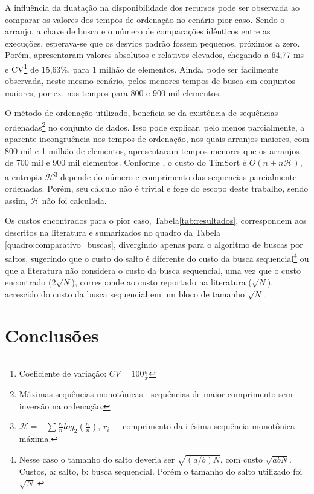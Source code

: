\documentclass[12pt]{article}
\begin{document}
A influência da fluatação na disponibilidade dos recursos pode ser observada ao comparar os valores dos tempos de ordenação no cenário pior caso. Sendo o arranjo, a chave de busca e o número de comparações idênticos entre as execuções, esperava-se que os desvios padrão fossem pequenos, próximos a zero. Porém, apresentaram valores absolutos e relativos elevados, chegando a 64,77 ms e CV\footnote{Coeficiente de variação: $CV=100\frac{\sigma}{\bar{x}}$} de 15,63\%, para 1 milhão de elementos. Ainda, pode ser facilmente observada, neste mesmo cenário, pelos menores tempos de busca em conjuntos maiores, por ex. nos tempos para 800 e 900 mil elementos.

O método de ordenação utilizado, beneficia-se da existência de sequências ordenadas\footnote{Máximas sequências monotônicas - sequências de maior comprimento sem inversão na ordenação.} no conjunto de dados. Isso pode explicar, pelo menos parcialmente, a aparente incongruência nos tempos de ordenação, nos quais arranjos maiores, com 800 mil e 1 milhão de elementos, apresentaram tempos menores que os arranjos de 700 mil e 900 mil elementos. Conforme \cite{auger:hal-01798381}, o custo do TimSort é $O(n + n\mathcal{H})$, a entropia $\mathcal{H}$\footnote{$\mathcal{H}=-\sum{\frac{r_{i}}{n} log_{2}(\frac{r_{i}}{n})}$, $r_{i} - $ comprimento da i-ésima sequência monotônica máxima.} depende do número e comprimento das sequencias parcialmente ordenadas. Porém, seu cálculo não é trivial e foge do escopo deste trabalho, sendo assim, $\mathcal{H}$ não foi calculada.

Os custos encontrados para o pior caso, Tabela\ref{tab:resultados}, correspondem aos descritos na literatura e sumarizados no quadro da Tabela \ref{quadro:comparativo_buscas}, divergindo apenas para o algoritmo de buscas por saltos, sugerindo que o custo do salto é diferente do custo da busca sequencial\footnote{Nesse caso o tamanho do salto deveria ser $\sqrt{(a/b)N}$, com custo $\sqrt{abN}$. Custos, a: salto, b: busca sequencial. Porém o tamanho do salto utilizado foi $\sqrt{N}$.} ou que a literatura não considera o custo da busca sequencial, uma vez que o custo encontrado ($2\sqrt{N}$), corresponde ao custo reportado na literatura ($\sqrt{N}$), acrescido do custo da busca sequencial em um bloco de tamanho $\sqrt{N}$.

\section{Conclusões}
\end{document}
